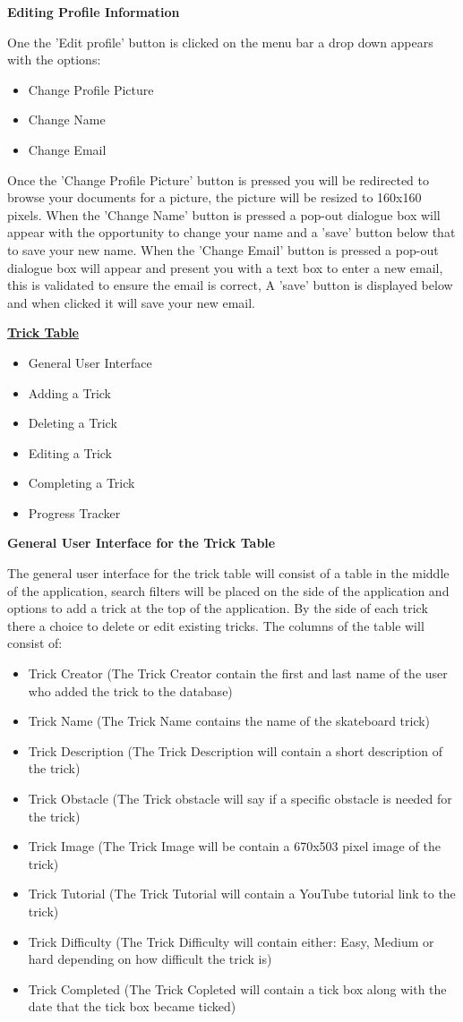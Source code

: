 \textbf{Editing Profile Information}

One the 'Edit profile' button is clicked on the menu bar a drop down appears with the options:
\begin{itemize}
\item Change Profile Picture
\item Change Name
\item Change Email
\end{itemize}

Once the 'Change Profile Picture' button is pressed you will be redirected to browse your documents for a picture, the picture will be resized to 160x160 pixels. When the 'Change Name' button is pressed a pop-out dialogue box will appear with the opportunity to change your name and a 'save' button below that to save your new name. When the 'Change Email' button is pressed a pop-out dialogue box will appear and present you with a text box to enter a new email, this is validated to ensure the email is correct, A 'save' button is displayed below and when clicked it will save your new email. 

\underline{\textbf{Trick Table}}
\begin{itemize}
\item General User Interface
\item Adding a Trick
\item Deleting a Trick
\item Editing a Trick
\item Completing a Trick
\item Progress Tracker 
\end{itemize}
\textbf{General User Interface for the Trick Table}

The general user interface for the trick table will consist of a table in the middle of the application, search filters will be placed on the side of the application and options to add a trick at the top of the application. By the side of each trick there a choice to delete or edit existing tricks. The columns of the table will consist of: 
\begin{itemize}
\item Trick Creator (The Trick Creator contain the first and last name of the user who added the trick to the database)
\item Trick Name (The Trick Name contains the name of the skateboard trick)
\item Trick Description (The Trick Description will contain a short description of the trick)
\item Trick Obstacle (The Trick obstacle will say if a specific obstacle is needed for the trick)
\item Trick Image (The Trick Image will be contain a 670x503 pixel image of the trick)
\item Trick Tutorial (The Trick Tutorial will contain a YouTube tutorial link to the trick)
\item Trick Difficulty (The Trick Difficulty will contain either: Easy, Medium or hard depending on how difficult the trick is)
\item Trick Completed (The Trick Copleted will contain a tick box along with the date that the tick box became ticked)
\end{itemize}

